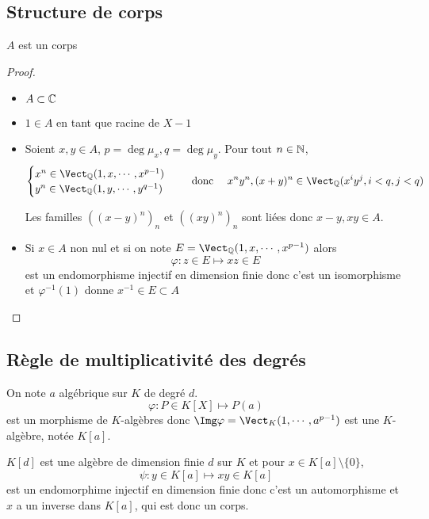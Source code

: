 \subsection{Structure de corps}

\begin{res}
$A$ est un corps
\end{res}

\begin{proof}
\begin{itemize}
    \item $A\subset \mathbb C$
    \item $1\in A$ en tant que racine de $X-1$
    \item Soient $x, y\in A$, $p=\deg \mu_x, q=\deg \mu_y$. Pour tout $n\in\mathbb N$, \[
        \begin{cases}
            x^n\in\Vect_{\Q}(1, x, \cdots, x^{p-1}) \\ y^n\in\Vect_{\Q}(1, y, \cdots, y^{q-1})
        \end{cases}\quad\text{ donc }\quad  x^ny^n, (x+y)^n\in\Vect_{\Q}(x^iy^j, i<q, j<q)
    \]

    Les familles $((x-y)^n)_n$ et $((xy)^n)_n$ sont liées donc $x-y, xy\in A$.
    \item Si $x\in A$ non nul et si on note $E=\Vect_{\Q}(1, x, \cdots, x^{p-1})$ alors \[
        \varphi: z\in E\longmapsto xz\in E
    \]
    est un endomorphisme injectif en dimension finie donc c'est un isomorphisme et $\varphi^{-1}(1)$ donne $x^{-1}\in E\subset A$
\end{itemize}
\end{proof}

\subsection{Règle de multiplicativité des degrés}


On note $a$ algébrique sur $K$ de degré $d$. \[
    \varphi: P\in K[X] \longmapsto P(a)
\]
est un morphisme de $K$-algèbres donc $\Img\varphi=\Vect_K(1, \cdots, a^{p-1})$ est une $K$-algèbre, notée $K[a]$.

$K[d]$ est une algèbre de dimension finie $d$ sur $K$ et pour $x\in K[a]\setminus \{0\}$, \[
    \psi: y\in K[a]\longmapsto xy\in K[a]
\]
est un endomorphime injectif en dimension finie donc c'est un automorphisme et $x$ a un inverse dans $K[a]$, qui est donc un corps.

